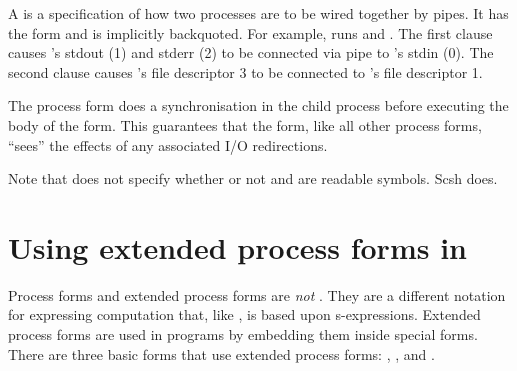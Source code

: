 A  is a specification of how two processes are to be wired
together by pipes. 
It has the form 
and is implicitly backquoted.
For example,
%
%
runs  and . 
The first clause  causes 's 
stdout (1) and stderr (2) to be connected via pipe 
to 's stdin (0). 
The second clause  causes 's file descriptor 3 to be
connected to 's file descriptor 1.

The  process form does a  synchronisation
in the child process before executing the body of the form.
This guarantees that the  form, like all other process forms,
``sees'' the effects of any associated I/O redirections.

Note that {\RnRS} does not specify whether or not \ex{|} and \ex{|+}
are readable symbols. Scsh does.

\section{Using extended process forms in \Scheme}
Process forms and extended process forms are \emph{not} {\Scheme}.
They are a different notation for expressing computation that, like {\Scheme},
is based upon s-expressions.
Extended process forms are used in {\Scheme} programs by embedding them inside
special {\Scheme} forms.
There are three basic {\Scheme} forms that use extended process forms: 
, \cd{&}, and .

